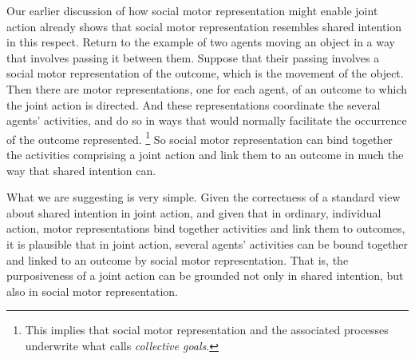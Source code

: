 \documentclass[12pt,\papersize]{extarticle}
\begin{document}

Our earlier discussion of how social motor representation might enable joint action already shows that social motor representation resembles shared intention in this respect.
Return to the example of two agents moving an object in a way that involves passing it between them.
Suppose that their passing involves a social motor representation of the outcome,
which is the movement of the object. 
Then there are motor representations, one for each agent, 
of an outcome to which the joint action is directed.
And these representations coordinate the several agents' activities,
and 
do so in ways that would normally facilitate the occurrence of the  outcome represented.%
\footnote{
This implies that social motor representation and the associated processes underwrite what \citet{Butterfill:2011_wija} calls \textit{collective goals}.
}
So social motor representation can bind together the activities comprising a joint action and link them to an outcome in much the way that shared intention can.



What we are suggesting is very simple.
Given the correctness of a standard view about shared intention in joint action, 
and 
given that in ordinary, individual action, motor representations  bind together activities and link them to outcomes,
it is plausible that 
in joint action, several agents' activities can be bound together and linked to an outcome by social motor representation.
That is,
the purposiveness of a joint action can be grounded not only in shared intention, but also in social motor representation.
\end{document}
